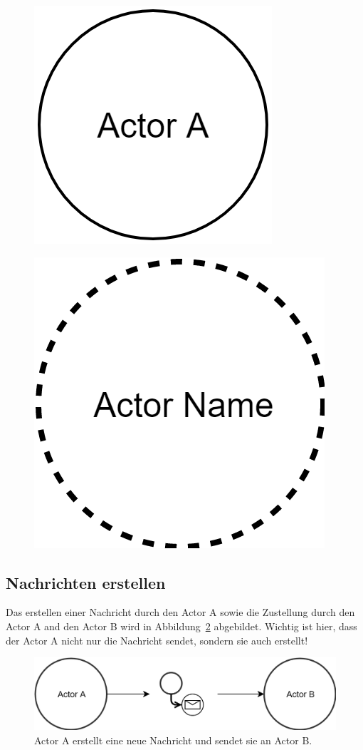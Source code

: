 \begin{figure}
    \centering
    \begin{minipage}{.5\textwidth}
      \centering
      \includegraphics[width=.5\linewidth]{gfx/actor/longLiveActor}
      \label{fig:test1}
    \end{minipage}%
    \begin{minipage}{.5\textwidth}
      \centering
      \includegraphics[width=.5\linewidth]{gfx/actor/shortLiveActor}
      \label{fig:test2}
    \end{minipage}
    \end{figure}  

\subsection{Nachrichten erstellen}
Das erstellen einer Nachricht durch den Actor {A} sowie die Zustellung durch den Actor {A} and den Actor {B} wird in Abbildung~\ref{fig:actor:diagram:simpleCreateAndSendMessage} abgebildet. Wichtig ist hier, dass der Actor {A} nicht nur die Nachricht sendet, sondern sie auch erstellt!
\begin{figure}
    \centering
    \includegraphics[width=\linewidth]{gfx/actor/simpleCreateAndSendMessage}
    \caption{Actor {A} erstellt eine neue Nachricht und sendet sie an Actor {B}.}
    \label{fig:actor:diagram:simpleCreateAndSendMessage}
\end{figure}

